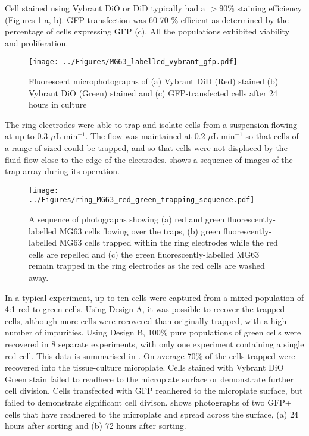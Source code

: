 Cell stained using Vybrant DiO or DiD typically had a $>90\%$ staining efficiency (Figures \ref{fig:MG63_labelled_vybrant_gfp} a, b). GFP transfection was 60-70 $\%$ efficient as determined by the percentage of cells expressing GFP (c). All the populations exhibited viability and proliferation.

\begin{figure}
	\centering
		\texttt{[image: ../Figures/MG63\_labelled\_vybrant\_gfp.pdf]}
	\caption[Fluorescently-labelled MG63 cells.]{Fluorescent microphotographs of (a) Vybrant DiD (Red) stained (b) Vybrant DiO (Green) stained and (c) GFP-transfected cells after 24 hours in culture}
	\label{fig:MG63_labelled_vybrant_gfp}
\end{figure}

The ring electrodes were able to trap and isolate cells from a suspension flowing at up to 0.3 $\mu$L min$^{-1}$. The flow was maintained at 0.2 $\mu$L min$^{-1}$ so that cells of a range of sized could be trapped, and so that cells were not displaced by the fluid flow close to the edge of the electrodes.  shows a sequence of images of the trap array during its operation.

\begin{figure}
	\centering
		\texttt{[image: ../Figures/ring\_MG63\_red\_green\_trapping\_sequence.pdf]}
	\caption[Image sequence taken during cell sorting using the ring electrodes.]{A sequence of photographs showing (a) red and green fluorescently-labelled MG63 cells flowing over the traps, (b) green fluorescently-labelled MG63 cells trapped within the ring electrodes while the red cells are repelled and (c) the green fluorescently-labelled MG63 remain trapped in the ring electrodes as the red cells are washed away.}
	\label{fig:ring_MG63_red_green_trapping_sequence}
\end{figure}

In a typical experiment, up to ten cells were captured from a mixed population of 4:1 red to green cells. Using Design A, it was possible to recover the trapped cells, although more cells were recovered than originally trapped, with a high number of impurities. Using Design B, 100\% pure populations of green cells were recovered in 8 separate experiments, with only one experiment containing a single red cell. This data is summarised in . On average 70\% of the cells trapped were recovered into the tissue-culture microplate. Cells stained with Vybrant DiO Green stain failed to readhere to the microplate surface or demonstrate further cell division. Cells transfected with GFP readhered to the microplate surface, but failed to demonstrate significant cell divison.  shows photographs of two GFP+ cells that have readhered to the microplate and spread across the surface, (a) 24 hours after sorting and (b) 72 hours after sorting.

